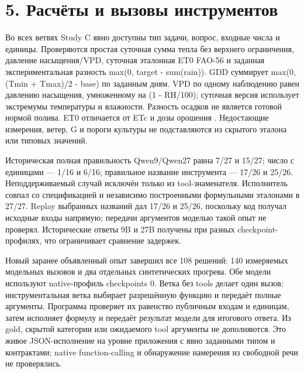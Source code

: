 \documentclass[14pt,a4paper]{extarticle}
\begin{document}
\section*{5. Расчёты и вызовы инструментов}

Во всех ветвях Study C явно доступны тип задачи, вопрос, входные числа и единицы. Проверяются простая суточная сумма тепла без верхнего ограничения, давление насыщения/VPD, суточная эталонная ET0 FAO-56 и заданная экспериментальная разность max(0, target - sum(rain)). GDD суммирует max(0, (Tmin + Tmax)/2 - base) по заданным дням. VPD по одному наблюдению равен давлению насыщения, умноженному на (1 - RH/100); суточная версия использует экстремумы температуры и влажности. Разность осадков не является готовой нормой полива. ET0 отличается от ETc и дозы орошения \cite{ref19}. Недостающие измерения, ветер, G и пороги культуры не подставляются из скрытого эталона или типовых значений.


Историческая полная правильность Qwen9/Qwen27 равна 7/27 и 15/27; число с единицами --- 1/16 и 6/16; правильное название инструмента --- 17/26 и 25/26. Неподдерживаемый случай исключён только из tool-знаменателя. Исполнитель совпал со спецификацией и независимо построенными формульными эталонами в 27/27. Replay выбранных названий дал 17/26 и 25/26, поскольку код получал исходные входы напрямую; передачи аргументов моделью такой опыт не проверял. Исторические ответы 9B и 27B получены при разных checkpoint-профилях, что ограничивает сравнение задержек.


Новый заранее объявленный опыт завершил все 108 решений: 140 измеряемых модельных вызовов и два отдельных синтетических прогрева. Обе модели используют native-профиль checkpoints 0. Ветка без tools делает один вызов; инструментальная ветка выбирает разрешённую функцию и передаёт полные аргументы. Программа проверяет их равенство публичным входам и единицам, затем исполняет формулу и передаёт результат модели для итогового ответа. Из gold, скрытой категории или ожидаемого tool аргументы не дополняются. Это живое JSON-исполнение на уровне приложения с явно заданными типом и контрактами; native function-calling и обнаружение намерения из свободной речи не проверялись.
\end{document}

